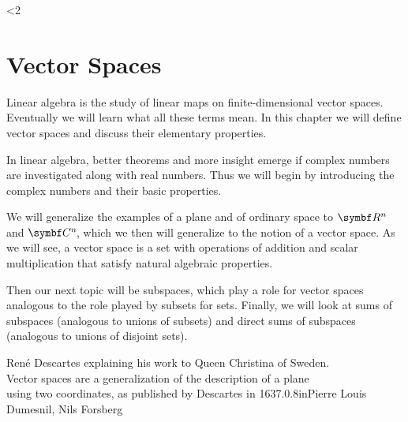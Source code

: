 
{
\ifnum\sizepaper<2 \setcounter{page}{0} \renewcommand{\CLEARDOUBLEPAGE}{\cleardoublepage} \fi

\chapter{Vector Spaces} \label{129}


}

Linear algebra is the study of linear maps on finite-dimensional vector spaces.  Eventually we will learn what all these terms mean.  In this chapter we will define vector spaces and discuss their elementary properties.

In linear algebra, better theorems and
more insight emerge if  complex numbers are investigated along with real
numbers.  Thus we will begin by introducing the complex numbers and their basic
properties.

We will generalize the examples of a plane and of ordinary space to $\R{n}$ and $\CC{n}$, which we then will generalize to the notion of a vector space. As we will see, a vector space is a set with operations of addition and scalar multiplication that satisfy natural algebraic properties.

Then our next topic will be subspaces, which play a role for vector spaces analogous to the role played by subsets for sets. Finally, we will look at sums of subspaces (analogous to unions of subsets) and direct sums of subspaces (analogous to unions of disjoint sets).

\renewcommand{\FigureName}{Descartes2.jpg}
\renewcommand{\FigureScale}{0.44}

\FigureHereCredit{artwork/\FigureName}{\FigureScale}%
{Ren\'e Descartes explaining his work to Queen Christina of Sweden.\\Vector spaces are a generalization of the description of a plane\\using two coordinates, as published by Descartes in 1637.}{0.8in}{Pierre Louis Dumesnil, Nils Forsberg}

